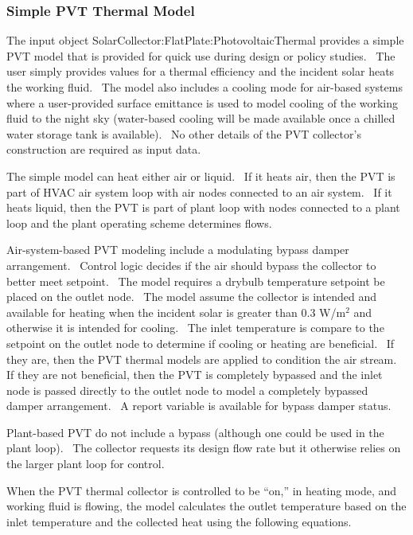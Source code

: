 \subsubsection{Simple PVT Thermal Model}\label{simple-pvt-thermal-model}

The input object SolarCollector:FlatPlate:PhotovoltaicThermal provides a simple PVT model that is provided for quick use during design or policy studies.~ The user simply provides values for a thermal efficiency and the incident solar heats the working fluid.~ The model also includes a cooling mode for air-based systems where a user-provided surface emittance is used to model cooling of the working fluid to the night sky (water-based cooling will be made available once a chilled water storage tank is available).~ No other details of the PVT collector's construction are required as input data.

The simple model can heat either air or liquid.~ If it heats air, then the PVT is part of HVAC air system loop with air nodes connected to an air system.~ If it heats liquid, then the PVT is part of plant loop with nodes connected to a plant loop and the plant operating scheme determines flows.

Air-system-based PVT modeling include a modulating bypass damper arrangement.~ Control logic decides if the air should bypass the collector to better meet setpoint.~ The model requires a drybulb temperature setpoint be placed on the outlet node.~ The model assume the collector is intended and available for heating when the incident solar is greater than 0.3 W/m\(^{2}\) and otherwise it is intended for cooling.~ The inlet temperature is compare to the setpoint on the outlet node to determine if cooling or heating are beneficial.~ If they are, then the PVT thermal models are applied to condition the air stream.~ If they are not beneficial, then the PVT is completely bypassed and the inlet node is passed directly to the outlet node to model a completely bypassed damper arrangement.~ A report variable is available for bypass damper status.

Plant-based PVT do not include a bypass (although one could be used in the plant loop).~ The collector requests its design flow rate but it otherwise relies on the larger plant loop for control.

When the PVT thermal collector is controlled to be ``on,'' in heating mode, and working fluid is flowing, the model calculates the outlet temperature based on the inlet temperature and the collected heat using the following equations.

